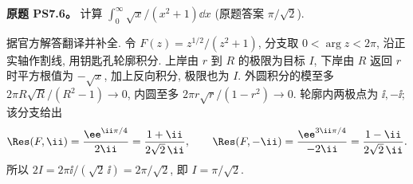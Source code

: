 \begin{exercise}
\textbf{原题 PS7.6。}\label{ass:ps7-6}
计算 $\int_0^\infty\sqrt x/(x^2+1)\dd x$ (原题答案 $\pi/\sqrt2$).
\end{exercise}
\begin{solution}
据官方解答翻译并补全. 令 $F(z)=z^{1/2}/(z^2+1)$, 分支取 $0<\arg z<2\pi$, 沿正实轴作割线, 用钥匙孔轮廓积分. 上岸由 $r$ 到 $R$ 的极限为目标 $I$, 下岸由 $R$ 返回 $r$ 时平方根值为 $-\sqrt x$, 加上反向积分, 极限也为 $I$.
外圆积分的模至多 $2\pi R\sqrt R/(R^2-1)\to0$, 内圆至多 $2\pi r\sqrt r/(1-r^2)\to0$. 轮廓内两极点为 $\ii,-\ii$; 该分支给出
\[
 \Res(F,\ii)=\frac{\ee^{\ii\pi/4}}{2\ii}=\frac{1+\ii}{2\sqrt2\,\ii},\qquad
 \Res(F,-\ii)=\frac{\ee^{3\ii\pi/4}}{-2\ii}=\frac{1-\ii}{2\sqrt2\,\ii}.
\]
所以 $2I=2\pi\ii/(\sqrt2\,\ii)=2\pi/\sqrt2$, 即 $I=\pi/\sqrt2$.
\begin{center}
\end{center}
\end{solution}

